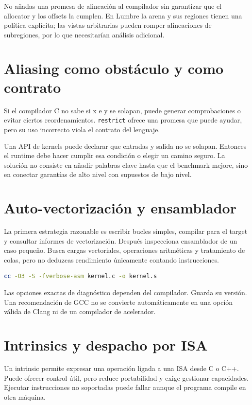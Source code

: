 \documentclass[12pt,a4paper,oneside]{report}
\begin{document}
No añadas una promesa de alineación al compilador sin garantizar que el allocator y los offsets la cumplen. En Lumbre la arena y sus regiones tienen una política explícita; las vistas arbitrarias pueden romper alineaciones de subregiones, por lo que necesitarían análisis adicional.

\section{Aliasing como obstáculo y como contrato}
Si el compilador C no sabe si x e y se solapan, puede generar comprobaciones o evitar ciertos reordenamientos. \texttt{restrict} ofrece una promesa que puede ayudar, pero su uso incorrecto viola el contrato del lenguaje.

Una API de kernels puede declarar que entradas y salida no se solapan. Entonces el runtime debe hacer cumplir esa condición o elegir un camino seguro. La solución no consiste en añadir palabras clave hasta que el benchmark mejore, sino en conectar garantías de alto nivel con supuestos de bajo nivel.

\section{Auto-vectorización y ensamblador}
La primera estrategia razonable es escribir bucles simples, compilar para el target y consultar informes de vectorización. Después inspecciona ensamblador de un caso pequeño. Busca cargas vectoriales, operaciones aritméticas y tratamiento de colas, pero no deduzcas rendimiento únicamente contando instrucciones.

\begin{lstlisting}[language=bash]
cc -O3 -S -fverbose-asm kernel.c -o kernel.s
\end{lstlisting}
Las opciones exactas de diagnóstico dependen del compilador. Guarda su versión. Una recomendación de GCC no se convierte automáticamente en una opción válida de Clang ni de un compilador de acelerador.

\section{Intrinsics y despacho por ISA}
Un intrinsic permite expresar una operación ligada a una ISA desde C o C++. Puede ofrecer control útil, pero reduce portabilidad y exige gestionar capacidades. Ejecutar instrucciones no soportadas puede fallar aunque el programa compile en otra máquina.
\end{document}
